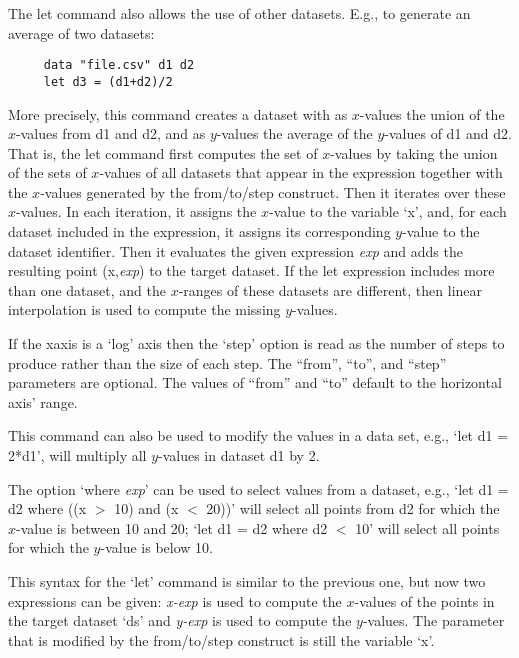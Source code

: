 \begin{commanddescription}
The let command also allows the use of other datasets. E.g., to generate an average of two datasets:

\begin{Verbatim}
     data "file.csv" d1 d2
     let d3 = (d1+d2)/2
\end{Verbatim}

More precisely, this command creates a dataset with as $x$-values the union of the $x$-values from d1 and d2, and as $y$-values the average of the $y$-values of d1 and d2. That is, the let command first computes the set of $x$-values by taking the union of the sets of $x$-values of all datasets that appear in the expression together with the $x$-values generated by the from/to/step construct. Then it iterates over these $x$-values. In each iteration, it assigns the $x$-value to the variable `x', and, for each dataset included in the expression, it assigns its corresponding $y$-value to the dataset identifier. Then it evaluates the given expression {\it exp} and adds the resulting point (x,{\it exp}) to the target dataset. If the let expression includes more than one dataset, and the $x$-ranges of these datasets are different, then linear interpolation is used to compute the missing $y$-values.

If the xaxis is a `log' axis then the `step' option is read as the number of steps to produce rather than the size of each step. The ``from'', ``to'', and ``step'' parameters are optional. The values of ``from'' and ``to'' default to the horizontal axis' range.

This command can also be used to modify the values in a data set, e.g., `let d1 = 2*d1', will multiply all $y$-values in dataset d1 by 2.

The option `where {\it exp}' can be used to select values from a dataset, e.g., `let d1 = d2 where ((x $>$ 10) and (x $<$ 20))' will select all points from d2 for which the $x$-value is between 10 and 20; `let d1 = d2 where d2 $<$ 10' will select all points for which the $y$-value is below 10.

\item[{\sf let ds = {\it x-exp, y-exp {\sf [from} low{\sf] [to} high{\sf] [step} exp{\sf] [where} exp{\sf]}}}]

This syntax for the `let' command is similar to the previous one, but now two expressions can be given: {\it x-exp} is used to compute the $x$-values of the points in the target dataset `ds' and {\it y-exp} is used to compute the $y$-values. The parameter that is modified by the from/to/step construct is still the variable `x'.


\end{commanddescription}
